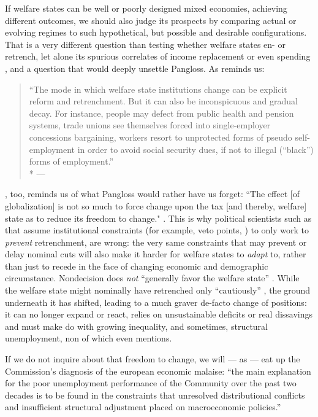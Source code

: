 If welfare states can be well or poorly designed mixed economies, achieving different outcomes, we should also judge its prospects by comparing actual or evolving regimes to such hypothetical, but possible and desirable configurations.
That is a very different question than testing whether welfare states en- or retrench, let alone its spurious correlates of income replacement \citep{Swank-2005-aa} or even spending \citep[24]{Kleinman2002}, and a question that would deeply unsettle Pangloss.
As \citeauthor{Offe2003} reminds us:

\begin{quote}
	``The mode in which welfare state institutions change can be explicit reform and retrenchment.
	But it can also be inconspicuous and gradual decay.
	For instance, people may defect from public health and pension systems, trade unions see themselves forced into single-employer concessions bargaining, workers resort to unprotected forms of pseudo self-employment in order to avoid social security dues, if not to illegal (“black”) forms of employment.''
	\\*
	--- \citet[364]{Offe2003}
\end{quote}

\citeauthor{Genschel2005}, too, reminds us of what Pangloss would rather have us forget:
``The effect [of globalization] is not so much to force change upon the tax [and thereby, welfare] state as to reduce its freedom to change." \citeyearpar[53]{Genschel2005}.
This is  why political scientists such as \cite{Pierson2002,Pierson1996} that assume institutional constraints (for example, veto points, \citealt{Tsebelis-2002-aa}) to only work to \emph{prevent} retrenchment, are wrong:
the very same constraints that may prevent or delay nominal cuts will also make it harder for welfare states to \emph{adapt} to, rather than just to recede in the face of changing economic and demographic circumstance.
Nondecision does \emph{not} ``generally favor the welfare state'' \citep[174]{Pierson1996}.
While the welfare state might nominally have retrenched only ``cautiously'' \citep[174]{Pierson1996}, the ground underneath it has shifted, leading to a much graver de-facto change of positions:
it can no longer expand or react, relies on unsustainable deficits or real dissavings and must make do with growing inequality, and sometimes, structural unemployment, non of which \citeauthor{Pierson1996} even mentions.

If we do not inquire about that freedom to change, we will --- as \citet[99]{Kleinman2002} --- eat up the Commission's diagnosis of the european economic malaise:
``the main explanation for the poor unemployment performance of the Community over the past two decades is to be found in the constraints that unresolved distributional conflicts and insufficient structural adjustment placed on macroeconomic policies.''

